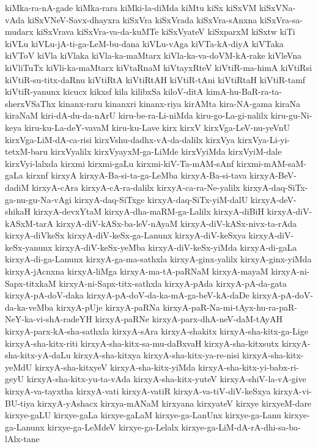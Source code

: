 {kiMka-ra-nA-gade
kiMka-rara
kiMki-la-diMda
kiMtu
kiSx
kiSxVM
kiSxVNa-vAda
kiSxVNeV-Savx-dhayxra
kiSxVra
kiSxVrada
kiSxVra-sAnxna
kiSxVra-sa-mudarx
kiSxVrava
kiSxVra-va-da-kuMTe
kiSxVyateV
kiSxparxM
kiSxtw
kiTi
kiVLu
kiVLu-jA-ti-ga-LeM-bu-dana
kiVLu-vAga
kiVTa-kA-diyA
kiVTaka
kiVToV
kiVla
kiVlaka
kiVla-ka-maMtarx
kiVla-ka-va-doVM-kA-rake
kiVleVna
kiVliTuTx
kiVli-ka-maMtarx
kiVtaRnaM
kiVtayxRteV
kiVtiR-ma-himA
kiVtiRsi
kiVtiR-su-titx-daRnu
kiVtiRtA
kiVtiRtAH
kiVtiR-tAni
kiVtiRtaH
kiVtiR-tamf
kiVtiR-yanunx
kicucx
kikxsf
kila
kilibxSa
kiloV-ditA
kimA-hu-BaR-ra-ta-sherxVSaThx
kinanx-raru
kinanxri
kinanx-riya
kirAMta
kira-NA-gama
kiraNa
kiraNaM
kiri-dA-du-da-nArU
kiru-be-ra-Li-niMda
kiru-go-La-gi-nalilx
kiru-gu-Ni-keya
kiru-ku-La-deY-vavaM
kiru-ku-Lave
kirx
kirxV
kirxVga-LeV-nu-yeVnU
kirxVga-LiM-dA-ca-risi
kirxVshu-dadhx-vA-da-dalilx
kirxVya
kirxVya-Li-yi-tetxM-baru
kirxVyalilx
kirxVyayxM-ga-LiMde
kirxVyiMda
kirxVyiM-dale
kirxVyi-lalxda
kirxmi
kirxmi-gaLu
kirxmi-kiV-Ta-mAM-sAnf
kirxmi-mAM-saM-gaLa
kirxnf
kirxyA
kirxyA-Ba-si-ta-ga-LeMba
kirxyA-Ba-si-tava
kirxyA-BeV-dadiM
kirxyA-cAra
kirxyA-cA-ra-dalilx
kirxyA-ca-ra-Ne-yalilx
kirxyA-daq-SiTx-ga-nu-gu-Na-vAgi
kirxyA-daq-SiTxge
kirxyA-daq-SiTx-yiM-dalU
kirxyA-deV-shikaH
kirxyA-devxYtaM
kirxyA-dha-maRM-ga-Lalilx
kirxyA-diBiH
kirxyA-diV-kASxM-tarA
kirxyA-diV-kASx-ba-leV-nAyaM
kirxyA-diV-kASx-nivx-ta-rAda
kirxyA-diVkeSx
kirxyA-diV-keSx-ga-Lanunx
kirxyA-diV-keSxya
kirxyA-diV-keSx-yanunx
kirxyA-diV-keSx-yeMba
kirxyA-diV-keSx-yiMda
kirxyA-di-gaLa
kirxyA-di-ga-Lanunx
kirxyA-ga-ma-sathxla
kirxyA-ginx-yalilx
kirxyA-ginx-yiMda
kirxyA-jAcnxna
kirxyA-liMga
kirxyA-ma-tA-paRNaM
kirxyA-mayaM
kirxyA-ni-Sapx-titxkaM
kirxyA-ni-Sapx-titx-sathxla
kirxyA-pAda
kirxyA-pA-da-gata
kirxyA-pA-doV-daka
kirxyA-pA-doV-da-ka-mA-ga-beV-kA-daDe
kirxyA-pA-doV-da-ka-veMba
kirxyA-pUje
kirxyA-paRNa
kirxyA-paR-Na-mi-tAyx-hu-ra-paR-NeY-ka-vi-shA-radeYH
kirxyA-paRNe
kirxyA-parx-dhA-neV-daM-tAyAH
kirxyA-parx-kA-sha-sathxla
kirxyA-sAra
kirxyA-shakitx
kirxyA-sha-kitx-ga-Lige
kirxyA-sha-kitx-riti
kirxyA-sha-kitx-sa-mu-daBxvaH
kirxyA-sha-kitxsutx
kirxyA-sha-kitx-yA-daLu
kirxyA-sha-kitxya
kirxyA-sha-kitx-ya-re-nisi
kirxyA-sha-kitx-yeMdU
kirxyA-sha-kitxyeV
kirxyA-sha-kitx-yiMda
kirxyA-sha-kitx-yi-babx-ri-geyU
kirxyA-sha-kitx-yu-ta-vAda
kirxyA-sha-kitx-yuteV
kirxyA-shiV-la-vA-give
kirxyA-va-tayxtha
kirxyA-vati
kirxyA-vatiR
kirxyA-va-tiV-diV-keSxya
kirxyA-vi-BU-tiya
kirxyA-yAshacx
kirxya-mANaM
kirxyana
kirxyateV
kirxye
kirxyeM-dare
kirxye-gaLU
kirxye-gaLa
kirxye-gaLaM
kirxye-ga-LanUnx
kirxye-ga-Lanu
kirxye-ga-Lanunx
kirxye-ga-LeMdeV
kirxye-ga-Lelalx
kirxye-ga-LiM-dA-rA-dhi-sa-ba-lAlx-tane
}

